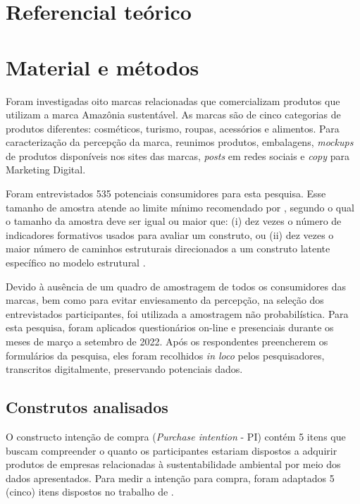 \section{Referencial teórico}



\section{Material e métodos}

Foram investigadas oito marcas relacionadas que comercializam produtos que utilizam a marca Amazônia sustentável. As marcas são de cinco categorias de produtos diferentes: cosméticos, turismo, roupas, acessórios e alimentos. Para caracterização da percepção da marca, reunimos produtos, embalagens, \textit{mockups} de produtos disponíveis nos sites das marcas, \textit{posts} em redes sociais e \textit{copy} para Marketing Digital.

Foram entrevistados 535 potenciais consumidores para esta pesquisa. Esse tamanho de amostra atende ao limite mínimo recomendado por , segundo o qual o tamanho da amostra deve ser igual ou maior que: (i) dez vezes o número de indicadores formativos usados para avaliar um construto, ou (ii) dez vezes o maior número de caminhos estruturais direcionados a um construto latente específico no modelo estrutural \cite{Hair2017AnResearch}. 

Devido à ausência de um quadro de amostragem de todos os consumidores das marcas, bem como para evitar enviesamento da percepção, na seleção dos entrevistados participantes, foi utilizada a amostragem não probabilística. Para esta pesquisa, foram aplicados questionários on-line e presenciais durante os meses de março a setembro de 2022. Após os respondentes preencherem os formulários da pesquisa, eles foram recolhidos \textit{in loco} pelos pesquisadores, transcritos digitalmente, preservando potenciais dados.



\subsection{Construtos analisados}

O constructo intenção de compra (\textit{Purchase intention} - PI) contém 5 itens que buscam compreender o quanto os participantes estariam dispostos a adquirir produtos de empresas relacionadas à sustentabilidade ambiental por meio dos dados apresentados. Para medir a intenção para compra, foram adaptados 5 (cinco) itens dispostos no trabalho de  .

